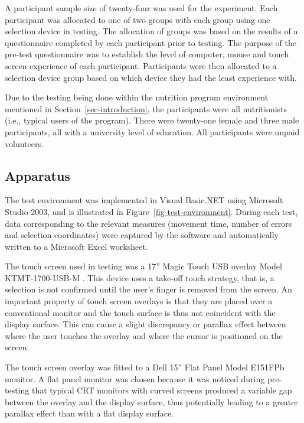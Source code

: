 \documentclass[reviewcopy]{elsart}
\begin{document}
A participant sample size of twenty-four was used for the experiment.
Each participant was allocated to one of two groups with each group
using one selection device in testing. The allocation of groups was
based on the results of a questionnaire completed by each participant
prior to testing. The purpose of the pre-test questionnaire was to
establish the level of computer, mouse and touch screen experience of
each participant. Participants were then allocated to a selection device
group based on which device they had the least experience with.

Due to the testing being done within the nutrition program environment
mentioned in Section~\ref{sec-introduction}, the participants were all
nutritionists (i.e., typical users of the program). There were
twenty-one female and three male participants, all with a university
level of education. All participants were unpaid volunteers.


\subsection{Apparatus}
\label{sec-method-apparatus}

The test environment was implemented in Visual Basic.NET using Microsoft
Studio 2003, and is illustrated in Figure~\ref{fig-test-environment}.
During each test, data corresponding to the relevant measures (movement
time, number of errors and selection coordinates) were captured by the
software and automatically written to a Microsoft Excel worksheet.

The touch screen used in testing was a 17'' Magic Touch USB overlay
Model KTMT-1700-USB-M \citep{Keyt-2005-Touch}. This device uses a
take-off touch strategy, that is, a selection is not confirmed until the
user's finger is removed from the screen. An important property of touch
screen overlays is that they are placed over a conventional monitor and
the touch surface is thus not coincident with the display surface. This
can cause a slight discrepancy or parallax effect between where the user
touches the overlay and where the cursor is positioned on the screen.

The touch screen overlay was fitted to a Dell 15'' Flat Panel Model
E151FPb monitor. A flat panel monitor was chosen because it was noticed
during pre-testing that typical CRT monitors with curved screens
produced a variable gap between the overlay and the display surface,
thus potentially leading to a greater parallax effect than with a flat
display surface.
\end{document}
